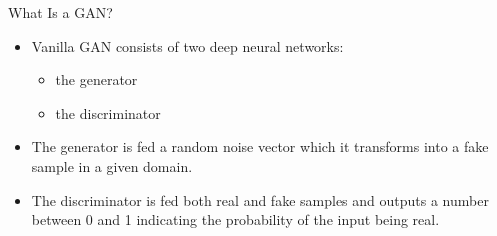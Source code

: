 \begin{frame} {What Is a GAN?}
    \begin{figure}
    \centering
    \end{figure}
    \begin{itemize}
    \item Vanilla GAN consists of two deep neural networks:
    \begin{itemize}
    \item the generator
    \item the discriminator
    \end{itemize}
    \item The generator is fed a random noise vector which it transforms into a fake sample in a given domain.
    \item The discriminator is fed both real and fake samples and outputs a number between 0 and 1 indicating the probability of the input being real.
    \end{itemize}
    \end{frame}
    
